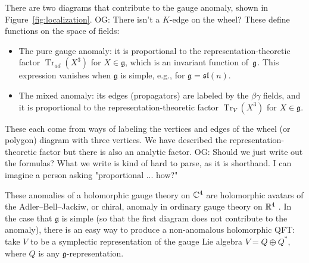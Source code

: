 \documentclass[11pt]{amsart}
\renewcommand{\op}{\operatorname}
\def\lie#1{\ensuremath{\mathfrak{#1}}}
\def\owen#1{{\textcolor{violet!50!black}{OG: {#1}}}}
\begin{document}
There are two diagrams that contribute to the gauge anomaly,
shown in Figure~\ref{fig:localization}.
\owen{There isn't a $K$-edge on the wheel?}
These define functions on the space of fields:
\begin{itemize}
\item The pure gauge anomaly: it is proportional to the representation-theoretic factor $\op{Tr}_{ad}(X^3)$ for  $X \in \lie{g}$, which is an invariant function of~$\mathfrak g$.
This expression vanishes when $\lie{g}$ is simple, e.g., for $\lie{g} = \lie{sl}(n)$.
\item The mixed anomaly: its edges (propagators) are labeled by the $\beta\gamma$ fields,
and it is proportional to the representation-theoretic factor $\op{Tr}_V(X^3)$ for $X \in \lie{g}$.
\end{itemize}
These each come from ways of labeling the vertices and edges of the wheel (or polygon) diagram with three vertices.
We have described the representation-theoretic factor but there is also an analytic factor.
\owen{Should we just write out the formulas? What we write is kind of hard to parse, as it is shorthand. I can imagine a person asking "proportional ... how?"}

These anomalies of a holomorphic gauge theory on $\mathbb C^4$ are holomorphic avatars of the Adler--Bell--Jackiw, or chiral, anomaly in ordinary gauge theory on $\mathbb R^4$ \cite{??}.
In the case that $\lie{g}$ is simple (so that the first diagram does not contribute to the anomaly), 
there is an easy way to produce a non-anomalous holomorphic QFT: 
take $V$ to be a symplectic representation of the gauge Lie algebra $V = Q \oplus Q^*$, where $Q$ is any $\lie{g}$-representation.
\end{document}

